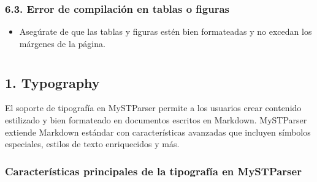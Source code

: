 \documentclass[a4paper,10pt,oneside,spanish,openany]{sphinxmanual}
\begin{document}
\subsubsection{6.3. Error de compilación en tablas o figuras}
\label{\detokenize{configuracion_inicial/009.Generar_PDF:error-de-compilacion-en-tablas-o-figuras}}\begin{itemize}
\item {} 
\sphinxAtStartPar
Asegúrate de que las tablas y figuras estén bien formateadas y no excedan los márgenes de la página.

\end{itemize}

\sphinxstepscope

\sphinxstepscope


\section{}
\label{\detokenize{configuracion_inicial/013.guia_de_myst_parser:guia-de-uso-myst-parser}}\label{\detokenize{configuracion_inicial/013.guia_de_myst_parser::doc}}

\subsection{1. Typography}
\label{\detokenize{configuracion_inicial/013.guia_de_myst_parser:typography}}
\sphinxAtStartPar
El soporte de tipografía en MyST\sphinxhyphen{}Parser permite a los usuarios crear contenido estilizado y bien formateado en documentos escritos en Markdown. MyST\sphinxhyphen{}Parser extiende Markdown estándar con características avanzadas que incluyen símbolos especiales, estilos de texto enriquecidos y más.


\subsubsection{Características principales de la tipografía en MyST\sphinxhyphen{}Parser}
\label{\detokenize{configuracion_inicial/013.guia_de_myst_parser:caracteristicas-principales-de-la-tipografia-en-myst-parser}}
\end{document}
